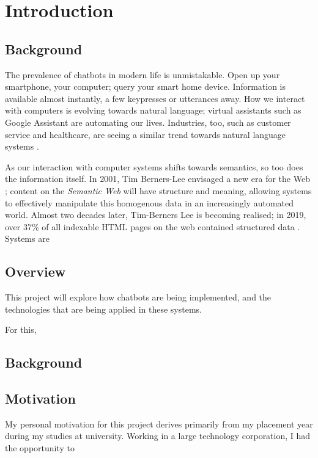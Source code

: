 \chapter{Introduction}
\label{ch:intro}
\section{Background}
The prevalence of chatbots in modern life is unmistakable. Open up your smartphone, your computer; query your smart home device. Information is available almost instantly, a few keypresses or utterances away. How we interact with computers is evolving towards natural language; virtual assistants such as Google Assistant are automating our lives. Industries, too, such as customer service and healthcare, are seeing a similar trend towards natural language systems \cite{gvr2017}.

As our interaction with computer systems shifts towards semantics, so too does the information itself. In 2001, Tim Berners-Lee envisaged a new era for the Web \cite{berners2001semantic}; content on the {\it Semantic Web} will have structure and meaning, allowing systems to effectively manipulate this homogenous data in an increasingly automated world. Almost two decades later, Tim-Berners Lee is becoming realised; in 2019, over 37\% of all indexable HTML pages on the web contained structured data \cite{wdc2019crawl}. Systems are 

\hilight{[...]}


\section{Overview}
This project will explore how chatbots are being implemented, and the technologies that are being applied in these systems.

For this, 

\section{Background}

\section{Motivation}
My personal motivation for this project derives primarily from my placement year during my studies at university. Working in a large technology corporation, I had the opportunity to 

\newpage

